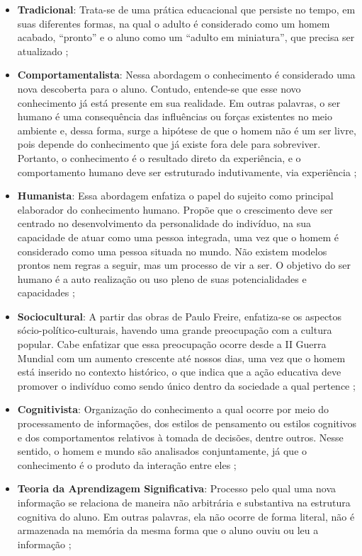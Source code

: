 \begin{itemize}
    \item \textbf{Tradicional}: Trata-se de uma prática educacional que persiste no tempo, em suas diferentes formas, na qual o adulto é considerado como um homem acabado, ``pronto'' e o aluno como um ``adulto em miniatura'', que precisa ser atualizado \cite{Mizukami1986};
    \item \textbf{Comportamentalista}: Nessa abordagem o conhecimento é considerado uma nova descoberta para o aluno. Contudo, entende-se que esse novo conhecimento já está presente em sua realidade. Em outras palavras, o ser humano é uma consequência das influências ou forças existentes no meio ambiente e, dessa forma, surge a hipótese de que o homem não é um ser livre, pois depende do conhecimento que já existe fora dele para sobreviver. Portanto, o conhecimento é o resultado direto da experiência, e o comportamento humano deve ser estruturado indutivamente, via experiência \cite{Mizukami1986};
    \item \textbf{Humanista}: Essa abordagem enfatiza o papel do sujeito como principal elaborador do conhecimento humano. Propõe que o crescimento deve ser centrado no desenvolvimento da personalidade do indivíduo, na sua capacidade de atuar como uma pessoa integrada, uma vez que o homem é considerado como uma pessoa situada no mundo. Não existem modelos prontos nem regras a seguir, mas um processo de vir a ser. O objetivo do ser humano é a auto realização ou uso pleno de suas potencialidades e capacidades \cite{Mizukami1986};
    \item \textbf{Sociocultural}: A partir das obras de Paulo Freire, enfatiza-se os aspectos sócio-político-culturais, havendo uma grande preocupação com a cultura popular. Cabe enfatizar que essa preocupação ocorre desde a II Guerra Mundial com um aumento crescente até nossos dias, uma vez que o homem está inserido no contexto histórico, o que indica que a ação educativa deve promover o indivíduo como sendo único dentro da sociedade a qual pertence \cite{Mizukami1986};
    \item \textbf{Cognitivista}: Organização do conhecimento a qual ocorre por meio do processamento de informações, dos estilos de pensamento ou estilos cognitivos e dos comportamentos relativos à tomada de decisões, dentre outros. Nesse sentido, o homem e mundo são analisados conjuntamente, já que o conhecimento é o produto da interação entre eles \cite{Mizukami1986};
    \item \textbf{Teoria da Aprendizagem Significativa}: Processo pelo qual uma nova informação se relaciona de maneira não arbitrária e substantiva na estrutura cognitiva do aluno. Em outras palavras, ela não ocorre de forma literal, não é armazenada na memória da mesma forma que o aluno ouviu ou leu a informação \cite{Ausubel1980};

\end{itemize}
